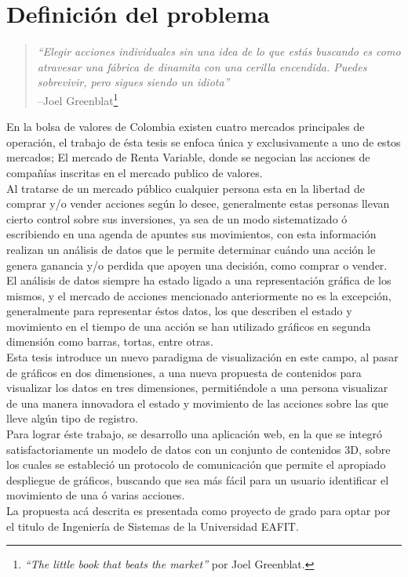 \chapter{Definición del problema}

\begin{quote} \textit{``Elegir acciones individuales sin una idea de lo que estás buscando es como atravesar una fábrica de dinamita con una cerilla encendida. Puedes sobrevivir, pero sigues siendo un idiota''}
  \\ --Joel Greenblat\footnote{\textit{``The little book that beats the market''} por Joel Greenblat.}
\end{quote} 
En la bolsa de valores de Colombia existen cuatro mercados principales de operación, el trabajo de ésta tesis se enfoca única y exclusivamente a uno de estos mercados; El mercado de Renta Variable, donde se negocian las acciones de compañías inscritas en el mercado publico de valores.\\

Al tratarse de un mercado público cualquier persona esta en la libertad de comprar y/o vender acciones según lo desee, generalmente estas personas llevan cierto control sobre sus inversiones, ya sea de un modo sistematizado ó escribiendo en una agenda de apuntes sus movimientos, con esta información realizan un análisis de datos que le permite determinar cuándo una acción le genera ganancia y/o perdida que apoyen una decisión, como comprar o vender.\\

El análisis de datos siempre ha estado ligado a una representación gráfica de los mismos, y el mercado de acciones mencionado anteriormente no es la excepción, generalmente para representar éstos datos, los que describen el estado y movimiento en el tiempo de una acción se han utilizado gráficos en segunda dimensión como barras, tortas, entre otras.\\

Esta tesis introduce un nuevo paradigma de visualización en este campo, al pasar de gráficos en dos dimensiones, a una nueva propuesta de contenidos para visualizar los datos en tres dimensiones, permitiéndole a una persona visualizar de una manera innovadora el estado y movimiento de las acciones sobre las que lleve algún tipo de registro.\\

Para lograr éste trabajo, se desarrollo una aplicación web, en la que se integró satisfactoriamente un modelo de datos con un conjunto de contenidos 3D, sobre los cuales se estableció un protocolo de comunicación que permite el apropiado despliegue de gráficos, buscando que sea más fácil para un usuario identificar el movimiento de una ó varias acciones.\\

La propuesta acá descrita es presentada como proyecto de grado para optar por el titulo de Ingeniería de Sistemas de la Universidad EAFIT.